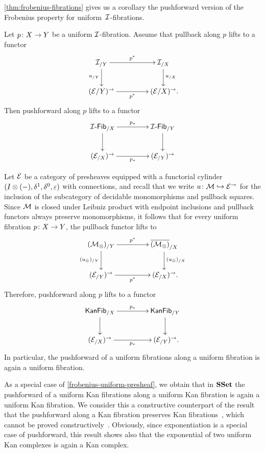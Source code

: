 \documentclass[reqno,10pt,a4paper,oneside,draft]{amsart}
\begin{document}
\cref{thm:frobenius-fibrations} gives us a corollary the pushforward version of the Frobenius property for uniform~$\cal{I}$-fibrations.

\begin{corollary}
Let $p \co X \to Y$ be a uniform $\cal{I}$-fibration.
Assume that pullback along $p$ lifts to a functor
\[
\xymatrix@C+2em{
  \cal{I}_{/Y}
  \ar[r]^{p^*}
  \ar[d]_{u_{/Y}}
&
  \cal{I}_{/X}
  \ar[d]^{u_{/X}}
\\
  (\catE / Y)^\to
  \ar[r]_{p^*}
&
  (\catE / X)^\to \rlap{.}
}
\]
Then pushforward along $p$ lifts to a functor
\[
\xymatrix@C+2em{
  \Fib{\cal{I}}_{/X} \ar[r]^{p_*} \ar[d] & \Fib{\cal{I}}_{/Y} \ar[d] \\
  (\cal{E}_{/X})^\to \ar[r]_{p_*} & (\cal{E}_{/Y})^\to
}
\]
\end{corollary}

\begin{example} \label{frobenius-uniform-presheaf} Let $\catE$ be a category of presheaves equipped with a functorial cylinder $( \interval \otimes (-), \rcyl, \lcyl, \ccyl)$ with connections, and recall that we write $u \co \cal{M} \hookrightarrow \catE^\to$ for the inclusion of the subcategory of decidable monomorphisms and pullback squares.
Since $\cal{M}$ is closed under Leibniz product with endpoint inclusions and pullback functors always preserve monomorphisms, it follows that for every uniform fibration $p \co X \to Y$, the pullback functor lifts to
\[
\xymatrix@C+2em{
  (\cal{M}_\otimes)_{/Y} \ar[r]^{p^*} \ar[d]_{(u_\otimes)_{/Y}} & \overline{(\cal{M}_\otimes)}_{/X} \ar[d]^{(u_\otimes)_{/X}} \\
  (\cal{E}_{/Y})^\to \ar[r]_{p^*} & (\cal{E}_{/X})^\to \rlap{.}
}
\]
Therefore, pushforward along $p$ lifts to a functor
\[
\xymatrix@C+2em{
  \mathsf{KanFib}_{/X} \ar[r]^{p_*} \ar[d]_{} & \mathsf{KanFib}_{/Y} \ar[d] \\
  (\cal{E}_{/X})^\to \ar[r]_{p_*} & (\cal{E}_{/Y})^\to \rlap{.}
}
\]
In particular, the pushforward of a uniform fibrations along a uniform fibration is again a uniform fibration.
\end{example}

\begin{example} As a special case of \cref{frobenius-uniform-presheaf}, we obtain that in $\SSet$ the pushforward of a uniform Kan fibrations along a uniform Kan fibration is again a uniform Kan fibration.
We consider this a constructive counterpart of the result that the pushforward along a Kan fibration preserves Kan fibrations~\cite{voevodsky-simplicial-model}, which cannot be proved constructively~\cite{coquand-non-constructivity-kan}.
Obviously, since exponentiation is a special case of pushforward, this result shows also that the exponential of two uniform Kan complexes is again a Kan complex.
\end{example}
\end{document}

